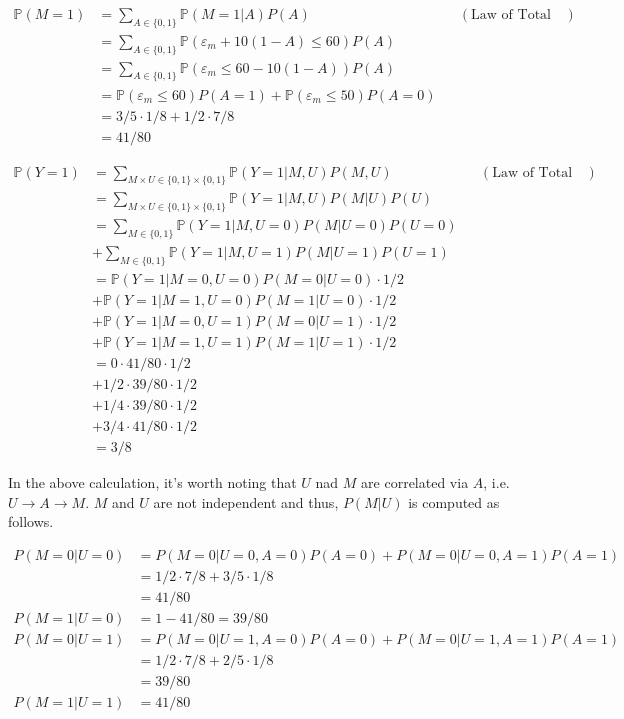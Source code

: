 \documentclass[10pt]{article}
\begin{document}
\begin{align*}
    \mathbb{P}(M=1) &=\sum_{A \in \{0,1\}}\mathbb{P}(M=1|A)P(A) && (\text{Law of Total Probability})\\
    &=\sum_{A \in \{0,1\}}\mathbb{P}(\varepsilon_m+10(1-A) \leq 60)P(A) \\
    &=\sum_{A \in \{0,1\}}\mathbb{P}(\varepsilon_m \leq 60-10(1-A))P(A) \\
    &=\mathbb{P}(\varepsilon_m \leq 60)P(A=1) + \mathbb{P}(\varepsilon_m \leq 50)P(A=0) \\
    &=3/5\cdot1/8 + 1/2\cdot7/8\\
    &=41/80
\end{align*}

\begin{align*}
    \mathbb{P}(Y=1) &=\sum_{M \times U \in \{0,1\} \times \{0,1 \}} \mathbb{P}(Y=1|M, U)P(M, U) && (\text{Law of Total Probability})\\
    &=\sum_{M \times U \in \{0,1\} \times \{0,1 \}} \mathbb{P}(Y=1|M, U)P(M|U)P(U)\\
    &=\sum_{M \in \{0,1\}} \mathbb{P}(Y=1|M, U=0)P(M|U=0)P(U=0) \\ &+ \sum_{M \in \{0,1\}} \mathbb{P}(Y=1|M, U=1)P(M|U=1)P(U=1)\\
    &=\mathbb{P}(Y=1|M=0, U=0)P(M=0|U=0)\cdot 1/2 \\& + \mathbb{P}(Y=1|M=1, U=0)P(M=1|U=0)\cdot 1/2 \\ &+ \mathbb{P}(Y=1|M=0, U=1)P(M=0|U=1)\cdot 1/2 \\ &+\mathbb{P}(Y=1|M=1, U=1)P(M=1|U=1)\cdot 1/2\\
    &=0\cdot 41/80 \cdot 1/2 \\
    & + 1/2 \cdot 39/80 \cdot 1/2 \\ 
    &+ 1/4 \cdot 39/80 \cdot 1/2 \\ 
    &+ 3/4 \cdot 41/80 \cdot 1/2\\
    &=3/8
\end{align*}

In the above calculation, it's worth noting that $U$ nad $M$ are correlated via $A$, i.e. $U \rightarrow A \rightarrow M$. $M$ and $U$ are not independent and thus, $P(M|U)$ is computed as follows.

\begin{align*}
    P(M=0|U=0) &=  P(M=0|U=0, A=0)P(A=0) + P(M=0|U=0, A=1)P(A=1) \\
    &=1/2 \cdot 7/8 + 3/5 \cdot 1/8 \\
    &=41/80\\
P(M=1|U=0) &= 1- 41/80 = 39/80 && \\
P(M=0|U=1) &=  P(M=0|U=1, A=0)P(A=0) + P(M=0|U=1, A=1)P(A=1) \\
&=1/2 \cdot 7/8 + 2/5 \cdot 1/8 \\
&=39/80\\
P(M=1|U=1) &=  41/80 \\
\end{align*}
\end{document}
